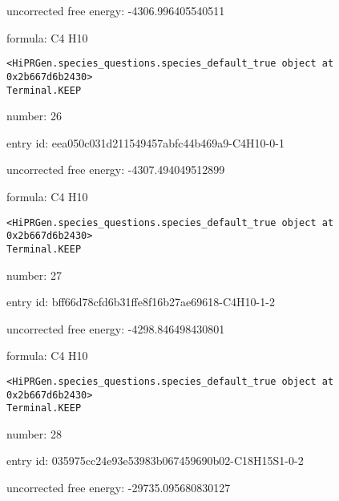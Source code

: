 \documentclass{article}
\begin{document}
uncorrected free energy: -4306.996405540511



formula: C4 H10


\vspace{1cm}
\begin{verbatim}
<HiPRGen.species_questions.species_default_true object at 0x2b667d6b2430>
Terminal.KEEP
\end{verbatim}


number: 26



entry id: eea050c031d211549457abfc44b469a9-C4H10-0-1



uncorrected free energy: -4307.494049512899



formula: C4 H10


\vspace{1cm}
\begin{verbatim}
<HiPRGen.species_questions.species_default_true object at 0x2b667d6b2430>
Terminal.KEEP
\end{verbatim}


number: 27



entry id: bff66d78cfd6b31ffe8f16b27ae69618-C4H10-1-2



uncorrected free energy: -4298.846498430801



formula: C4 H10


\vspace{1cm}
\begin{verbatim}
<HiPRGen.species_questions.species_default_true object at 0x2b667d6b2430>
Terminal.KEEP
\end{verbatim}


number: 28



entry id: 035975cc24e93e53983b067459690b02-C18H15S1-0-2



uncorrected free energy: -29735.095680830127
\end{document}
